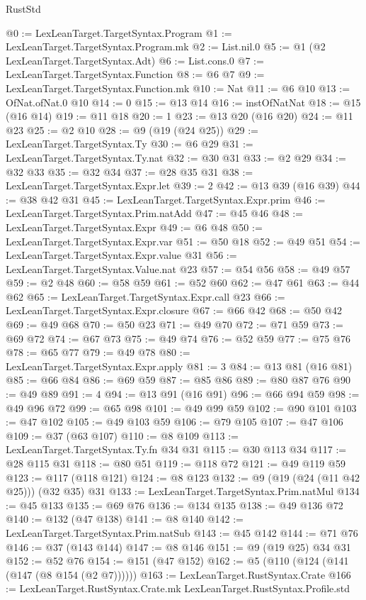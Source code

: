 \begin{lexlean}{RustStd}
\begin{coremodule}
@0 := LexLeanTarget.TargetSyntax.Program
@1 := LexLeanTarget.TargetSyntax.Program.mk
@2 := List.nil.{0}
@5 := @1 (@2 LexLeanTarget.TargetSyntax.Adt)
@6 := List.cons.{0}
@7 := LexLeanTarget.TargetSyntax.Function
@8 := @6 @7
@9 := LexLeanTarget.TargetSyntax.Function.mk
@10 := Nat
@11 := @6 @10
@13 := OfNat.ofNat.{0} @10
@14 := 0
@15 := @13 @14
@16 := instOfNatNat
@18 := @15 (@16 @14)
@19 := @11 @18
@20 := 1
@23 := @13 @20 (@16 @20)
@24 := @11 @23
@25 := @2 @10
@28 := @9 (@19 (@24 @25))
@29 := LexLeanTarget.TargetSyntax.Ty
@30 := @6 @29
@31 := LexLeanTarget.TargetSyntax.Ty.nat
@32 := @30 @31
@33 := @2 @29
@34 := @32 @33
@35 := @32 @34
@37 := @28 @35 @31
@38 := LexLeanTarget.TargetSyntax.Expr.let
@39 := 2
@42 := @13 @39 (@16 @39)
@44 := @38 @42 @31
@45 := LexLeanTarget.TargetSyntax.Expr.prim
@46 := LexLeanTarget.TargetSyntax.Prim.natAdd
@47 := @45 @46
@48 := LexLeanTarget.TargetSyntax.Expr
@49 := @6 @48
@50 := LexLeanTarget.TargetSyntax.Expr.var
@51 := @50 @18
@52 := @49 @51
@54 := LexLeanTarget.TargetSyntax.Expr.value @31
@56 := LexLeanTarget.TargetSyntax.Value.nat @23
@57 := @54 @56
@58 := @49 @57
@59 := @2 @48
@60 := @58 @59
@61 := @52 @60
@62 := @47 @61
@63 := @44 @62
@65 := LexLeanTarget.TargetSyntax.Expr.call @23
@66 := LexLeanTarget.TargetSyntax.Expr.closure
@67 := @66 @42
@68 := @50 @42
@69 := @49 @68
@70 := @50 @23
@71 := @49 @70
@72 := @71 @59
@73 := @69 @72
@74 := @67 @73
@75 := @49 @74
@76 := @52 @59
@77 := @75 @76
@78 := @65 @77
@79 := @49 @78
@80 := LexLeanTarget.TargetSyntax.Expr.apply
@81 := 3
@84 := @13 @81 (@16 @81)
@85 := @66 @84
@86 := @69 @59
@87 := @85 @86
@89 := @80 @87 @76
@90 := @49 @89
@91 := 4
@94 := @13 @91 (@16 @91)
@96 := @66 @94 @59
@98 := @49 @96 @72
@99 := @65 @98
@101 := @49 @99 @59
@102 := @90 @101
@103 := @47 @102
@105 := @49 @103 @59
@106 := @79 @105
@107 := @47 @106
@109 := @37 (@63 @107)
@110 := @8 @109
@113 := LexLeanTarget.TargetSyntax.Ty.fn @34 @31
@115 := @30 @113 @34
@117 := @28 @115 @31
@118 := @80 @51
@119 := @118 @72
@121 := @49 @119 @59
@123 := @117 (@118 @121)
@124 := @8 @123
@132 := @9 (@19 (@24 (@11 @42 @25))) (@32 @35) @31
@133 := LexLeanTarget.TargetSyntax.Prim.natMul
@134 := @45 @133
@135 := @69 @76
@136 := @134 @135
@138 := @49 @136 @72
@140 := @132 (@47 @138)
@141 := @8 @140
@142 := LexLeanTarget.TargetSyntax.Prim.natSub
@143 := @45 @142
@144 := @71 @76
@146 := @37 (@143 @144)
@147 := @8 @146
@151 := @9 (@19 @25) @34 @31
@152 := @52 @76
@154 := @151 (@47 @152)
@162 := @5 (@110 (@124 (@141 (@147 (@8 @154 (@2 @7))))))
@163 := LexLeanTarget.RustSyntax.Crate
@166 := LexLeanTarget.RustSyntax.Crate.mk LexLeanTarget.RustSyntax.Profile.std

\end{coremodule}
\end{lexlean}
